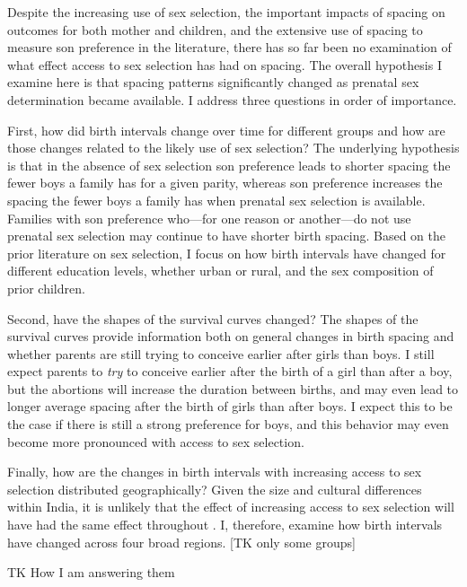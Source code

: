 \documentclass[12pt,letterpaper]{article}
\begin{document}
Despite the increasing use of sex selection, the important impacts of spacing on outcomes 
for both mother and children, and the extensive use of spacing to measure son 
preference in the literature, there has so far been no examination of what effect access 
to sex selection has had on spacing.
The overall hypothesis I examine here is that spacing patterns significantly changed 
as prenatal sex determination became available.
I address three questions in order of importance.

First, how did birth intervals change over time for different groups and how are those 
changes related to the likely use of sex selection?
The underlying hypothesis is that in the absence of sex selection son preference leads to 
shorter spacing the fewer boys a family has for a given parity, whereas son preference 
increases the spacing the fewer boys a family has when prenatal sex selection is available.
Families with son preference who---for one reason or another---do not use prenatal sex 
selection may continue to have shorter birth spacing.
Based on the prior literature on sex selection, I focus on how birth intervals have
changed for different education levels, whether urban or rural, and the sex composition of 
prior children.

Second, have the shapes of the survival curves changed?
The shapes of the survival curves provide information both on general changes in birth 
spacing and whether parents are still trying to conceive earlier after girls than boys.
I still expect parents to \emph{try} to conceive earlier after the birth 
of a girl than after a boy, but the abortions will increase the duration between births, 
and may even lead to longer average spacing after the birth of girls than after boys.
I expect this to be the case if there is still a strong preference for boys, and this 
behavior may even become more pronounced with access to sex selection.

Finally, how are the changes in birth intervals with increasing access to sex selection 
distributed geographically?
Given the size and cultural differences within India, it is unlikely that the effect of
increasing access to sex selection will have had the same effect throughout 
\citep{retherford03b}.
I, therefore, examine how birth intervals have changed across four broad regions.
[TK only some groups]



TK How I am answering them
\end{document}
